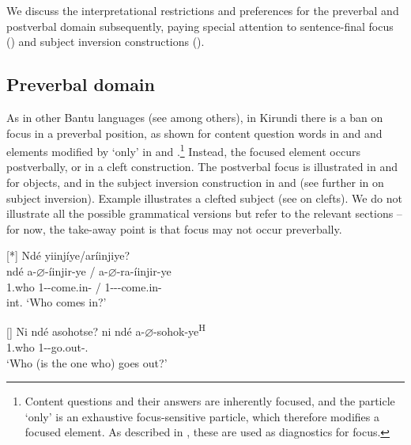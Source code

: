 \documentclass[output=paper]{langscibook}
\begin{document}
\z
\z

We discuss the interpretational restrictions and preferences for the preverbal and postverbal domain subsequently, paying special attention to sentence-final focus () and subject inversion constructions ().

\subsection{Preverbal domain}

As in other Bantu languages (see \citealt{Zerbian2006a,Yoneda2011,vanderWal2009} among others), in Kirundi there is a ban on focus in a preverbal position, as shown for content question words in  and  and elements modified by ‘only’ in  and .\footnote{Content questions and their answers are inherently focused, and the particle ‘only’ is an exhaustive focus-sensitive particle, which therefore modifies a focused element. As described in \textcite{chapters/intro}, these are used as diagnostics for focus.} Instead, the focused element occurs postverbally, or in a cleft construction. The postverbal focus is illustrated in  and  for objects, and in the subject inversion construction in  and  (see further in  on subject inversion). Example  illustrates a clefted subject (see  on clefts). We do not illustrate all the possible grammatical versions but refer to the relevant sections – for now, the take-away point is that focus may not occur preverbally.

\ea
\label{bkm:Ref72332402}
\ea
[*]{
\label{bkm:Ref72332402:a}
Ndé yiinjíye/aríinjiye?\\
\gll
ndé  a-$\varnothing$-íinjir-ye / a-$\varnothing$-ra-íinjir-ye\\
1.who  1\SM-\PRS{}-come.in-\PFV{} / 1\SM-\PRS-\DJ{}-come.in-\PFV{}\\
\glt
int. ‘Who comes in?’\\
}

\ex
[]{
\label{bkm:Ref72332402:b}
Ni ndé asohotse?  \jambox*{[cleft]}
\gll
ni  ndé  a-$\varnothing$-sohok-ye\textsuperscript{H}\\
\COP{}  1.who  1\SM-\PRS-{}go.out-\PFV.\REL{}\\
\glt
‘Who (is the one who) goes out?’\\
}
\end{document}
